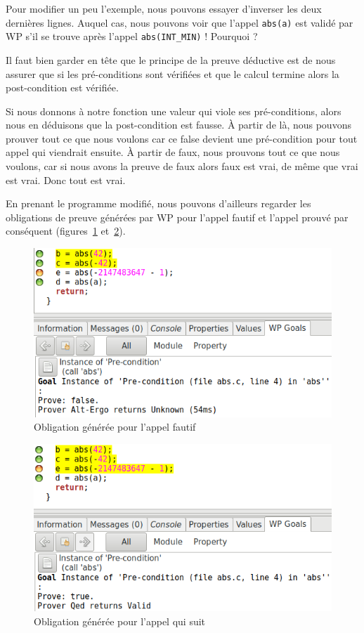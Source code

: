 \documentclass[12pt,francais,]{scrbook}
\begin{document}
Pour modifier un peu l'exemple, nous pouvons essayer d'inverser les deux
dernières lignes. Auquel cas, nous pouvons voir que l'appel
\texttt{abs(a)} est validé par WP s'il se trouve après l'appel
\texttt{abs(INT\_MIN)} ! Pourquoi ?

Il faut bien garder en tête que le principe de la preuve déductive est
de nous assurer que si les pré-conditions sont vérifiées et que le
calcul termine alors la post-condition est vérifiée.

Si nous donnons à notre fonction une valeur qui viole ses
pré-conditions, alors nous en déduisons que la post-condition est
fausse. À partir de là, nous pouvons prouver tout ce que nous voulons
car ce \og{}false\fg{} devient une pré-condition pour tout appel qui viendrait
ensuite. À partir de faux, nous prouvons tout ce que nous voulons, car
si nous avons la preuve de \og{}faux\fg{} alors \og{}faux\fg{} est vrai, de même que
\og{}vrai\fg{} est vrai. Donc tout est vrai.

En prenant le programme modifié, nous pouvons d'ailleurs regarder les
obligations de preuve générées par WP pour l'appel fautif et l'appel
prouvé par conséquent
(figures~\ref{fig:2-1-2-foo-2} et~\ref{fig:2-1-2-foo-3}).

\begin{figure}[htbp]
\centering
\includegraphics[scale=0.5]{2-1-2-foo-2.png}
\caption{Obligation générée pour l'appel fautif}
\label{fig:2-1-2-foo-2}
\end{figure}

\begin{figure}[htbp]
\centering
\includegraphics[scale=0.5]{2-1-2-foo-3.png}
\caption{Obligation générée pour l'appel qui suit}
\label{fig:2-1-2-foo-3}
\end{figure}
\end{document}
